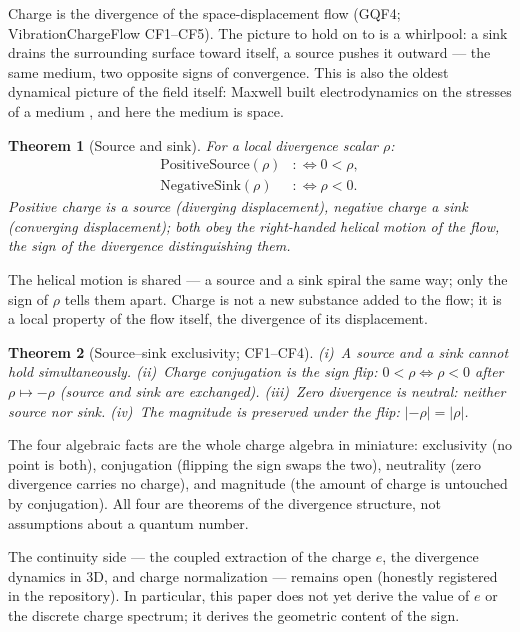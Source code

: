 \documentclass[aps,prd,preprint,superscriptaddress,amsmath,amssymb]{revtex4-2}
\newtheorem{theorem}{Theorem}[section]
\begin{document}
Charge is the divergence of the space-displacement flow
(GQF4; VibrationChargeFlow CF1--CF5).  The picture to hold on to is a
whirlpool: a sink drains the surrounding surface toward itself, a
source pushes it outward --- the same medium, two opposite signs of
convergence.  This is also the oldest dynamical picture of the field
itself: Maxwell built electrodynamics on the stresses of a medium
\cite{maxwell1996dynamical}, and here the medium is space.

\begin{theorem}[Source and sink]
\label{def:srcsink}
For a local divergence scalar $\rho$:
\begin{align}
\text{PositiveSource}(\rho) &:\Longleftrightarrow 0<\rho ,\\
\text{NegativeSink}(\rho)   &:\Longleftrightarrow \rho<0 .
\end{align}
Positive charge is a source (diverging displacement), negative charge
a sink (converging displacement); both obey the right-handed helical
motion of the flow, the sign of the divergence distinguishing them.
\end{theorem}

The helical motion is shared --- a source and a sink spiral the same
way; only the sign of $\rho$ tells them apart.  Charge is not a new
substance added to the flow; it is a local property of the flow
itself, the divergence of its displacement.

\begin{theorem}[Source--sink exclusivity; CF1--CF4]
\label{thm:srcsink}
(i)~A source and a sink cannot hold simultaneously.  (ii)~Charge
conjugation is the sign flip: $0<\rho \iff \rho<0$ after
$\rho\mapsto-\rho$ (source and sink are exchanged).  (iii)~Zero
divergence is neutral: neither source nor sink.  (iv)~The magnitude is
preserved under the flip: $|{-}\rho|=|\rho|$.
\end{theorem}

The four algebraic facts are the whole charge algebra in miniature:
exclusivity (no point is both), conjugation (flipping the sign swaps
the two), neutrality (zero divergence carries no charge), and magnitude
(the amount of charge is untouched by conjugation).  All four are
theorems of the divergence structure, not assumptions about a quantum
number.

The continuity side --- the coupled extraction of the charge $e$, the
divergence dynamics in 3D, and charge normalization --- remains open
(honestly registered in the repository).  In particular, this paper
does not yet derive the value of $e$ or the discrete charge spectrum;
it derives the geometric content of the sign.
\end{document}
